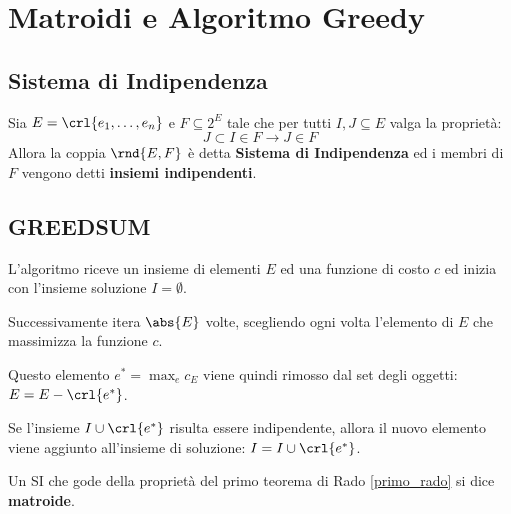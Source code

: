 \documentclass[\main/main.tex]{subfiles}
\begin{document}
\chapter{Matroidi e Algoritmo Greedy}
\section{Sistema di Indipendenza}
\begin{definition}
  Sia \(E = \crl{e_1, \ldots, e_n}\) e \(F \subseteq 2^E\) tale che per tutti \(I, J \subseteq E\) valga la proprietà:
  \[
    J \subset I \in F \rightarrow J \in F
  \]
  Allora la coppia \(\rnd{E, F}\) è detta \textbf{Sistema di Indipendenza} ed i membri di \(F\) vengono detti \textbf{insiemi indipendenti}.
\end{definition}
\section{GREEDSUM}
L'algoritmo riceve un insieme di elementi \(E\) ed una funzione di costo \(c\) ed inizia con l'insieme soluzione \(I = \emptyset \).

Successivamente itera \(\abs{E}\) volte, scegliendo ogni volta l'elemento di \(E\) che massimizza la funzione \(c\).

Questo elemento \(e^* = \max_e c_{E}\) viene quindi rimosso dal set degli oggetti: \(E = E - \crl{e^*}\).

Se l'insieme \(I \cup \crl{e^*}\) risulta essere indipendente, allora il nuovo elemento viene aggiunto all'insieme di soluzione: \(I = I \cup \crl{e^*}\).
\begin{definition}[Matroide]
  Un SI che gode della proprietà del primo teorema di Rado \ref{primo_rado} si dice \textbf{matroide}.
\end{definition}
\clearpage
\end{document}
